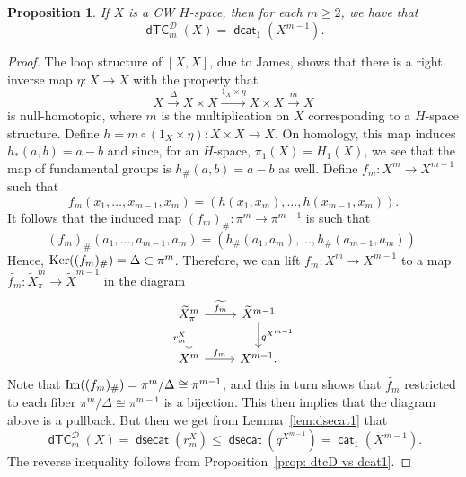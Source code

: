 \documentclass[amscd,amssymb,verbatim,11pt]{amsart}
\theoremstyle{plain}
\newtheorem{proposition}[thm]{Proposition}
\theoremstyle{definition}
\newcommand{\Wi}{\widetilde}
\DeclareMathOperator{\cat}{{\mathsf{cat}}}
\DeclareMathOperator{\dsecat}{{\mathsf{dsecat}}}
\DeclareMathOperator{\dcat}{{\mathsf{dcat}}}
\DeclareMathOperator{\dTC}{{\mathsf{dTC}}}
\DeclareMathOperator{\Ker}{{\rm Ker}}
\newcommand{\D}{\mathcal{D}}
\def\Im{\protect\operatorname{Im}}
\begin{document}
\begin{proposition}\label{prop:Hspace}
If $X$ is a CW $H$-space, then for each $m\ge 2$, we have that
\[
\dTC_m^{\D}(X) = \dcat_1(X^{m-1}).
\]
\end{proposition}
\begin{proof}
The loop structure of $[X,X]$, due to James, shows that there is a right inverse map
$\eta\colon X \to X$ with the property that
\[
X\xrightarrow{\Delta} X\times X\xrightarrow{1_X\times \eta} X\times X\xrightarrow{m} X
\]
is null-homotopic, where $m$ is the multiplication on $X$ corresponding to a $H$-space structure. Define $h=m\circ (1_X \times \eta)\colon X\times X\to X$. On homology, this map induces $h_*(a,b)=a-b$ and since, for an $H$-space, $\pi_1(X)=H_1(X)$, we see that the map of fundamental groups is $h_\#(a,b)=a-b$ as well. Define $f_m\colon X^{m}\to X^{m-1}$ such that
\[
f_m\left(x_1,\ldots,x_{m-1},x_m\right)=\left(h\left(x_1,x_m\right),\ldots,h\left(x_{m-1},x_m\right)\right).
\]
It follows that the induced map $(f_m)_\#\colon \pi^m\to \pi^{m-1}$ is such that
\[
(f_m)_\#\left(a_1,\ldots,a_{m-1},a_m\right)=\left(h_\#\left(a_1,a_m\right),\ldots,h_\#\left(a_{m-1},a_m\right)\right).
\]
Hence, $\Ker((f_m)_\#)=\Delta\subset \pi^m$. Therefore, we can lift $f_m\colon X^m\to X^{m-1}$ to a map $\Wi{f_m}\colon \Wi{X}^m_\pi\to \Wi{X}^{m-1}$ in the diagram
\[
\begin{tikzcd}
    \Wi{X}^m_\pi \arrow{r}{\Wi{f_m}} \arrow{d}[swap]{r_m^X}
    &
    \Wi{X}^{m-1}\arrow{d}{q^{X^{m-1}}}
    \\
    X^m\arrow{r}{f_m}
    &
    X^{m-1}.
\end{tikzcd}
\]
Note that $\Im((f_m)_\#)=\pi^m/\Delta\cong\pi^{m-1}$,  and this in turn shows that $\Wi{f_m}$ restricted to each fiber $\pi^m/\Delta\cong\pi^{m-1}$ is a bijection. This then implies that the diagram above
is a pullback. But then we get from Lemma~\ref{lem:dsecat1} that
\[
    \dTC_m^{\D}(X)=\dsecat(r_m^X)\le \dsecat(q^{X^{m-1}})=\cat_1(X^{m-1}).
\]
The reverse inequality follows from Proposition~\ref{prop: dtcD vs dcat1}.
\end{proof}
\end{document}
